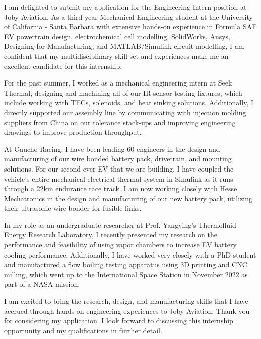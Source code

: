 \documentclass[11pt, letterpaper]{awesome-cv} %
\begin{document}
\makecvheader %

\makelettertitle %


\begin{cvletter}


I am delighted to submit my application for the Engineering Intern position at Joby Aviation. As a third-year Mechanical Engineering student at the University of California - Santa Barbara with extensive hands-on experience in Formula SAE EV powertrain design, electrochemical cell modelling, SolidWorks, Ansys, Designing-for-Manufacturing, and MATLAB/Simulink circuit modelling, I am confident that my multidisciplinary skill-set and experiences make me an excellent candidate for this internship.

For the past summer, I worked as a mechanical engineering intern at Seek Thermal, designing and machining all of our IR sensor testing fixtures, which include working with TECs, solenoids, and heat sinking solutions. Additionally, I directly supported our assembly line by communicating with injection molding suppliers from China on our tolerance stack-ups and improving engineering drawings to improve production throughput. 

At Gaucho Racing, I have been leading 60 engineers in the design and manufacturing of our wire bonded battery pack, drivetrain, and mounting solutions. For our second ever EV that we are building, I have coupled the vehicle's entire mechanical-electrical-thermal system in Simulink as it runs through a 22km endurance race track. I am now working closely with Hesse Mechatronics in the design and manufacturing of our new battery pack, utilizing their ultrasonic wire bonder for fusible links.  

In my role as an undergraduate researcher at Prof. Yangying's Thermofluid Energy Research Laboratory, I recently presented my research on the performance and feasibility of using vapor chambers to increase EV battery cooling performance. Additionally, I have worked very closely with a PhD student and manufactured a flow boiling testing apparatus using 3D printing and CNC milling, which went up to the International Space Station in November 2022 as part of a NASA mission. 

I am excited to bring the research, design, and manufacturing skills that I have accrued through hands-on engineering experiences to Joby Aviation. Thank you for considering my application. I look forward to discussing this internship opportunity and my qualifications in further detail.


\end{cvletter}


\makeletterclosing %
\end{document}
